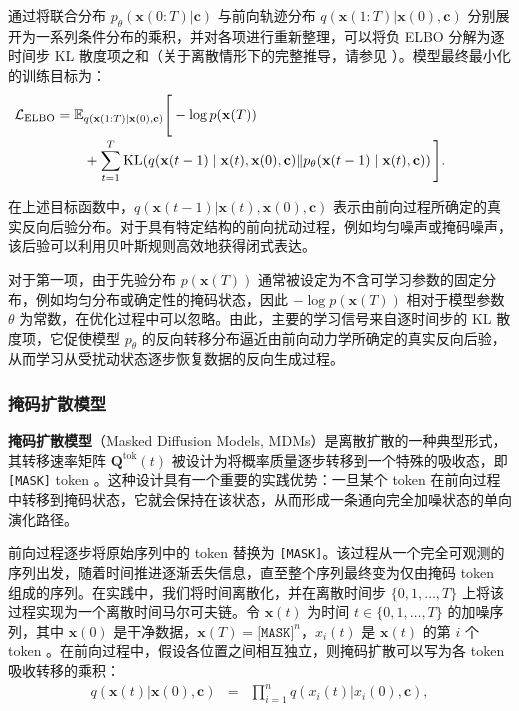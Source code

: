 通过将联合分布 $p_\theta(\mathbf{x}(0{:}T) | \mathbf{c})$ 与前向轨迹分布 $q(\mathbf{x}(1{:}T) | \mathbf{x}(0), \mathbf{c})$ 分别展开为一系列条件分布的乘积，并对各项进行重新整理，可以将负 ELBO 分解为逐时间步 KL 散度项之和（关于离散情形下的完整推导，请参见 \citep{austin-etal:2021structured}）。模型最终最小化的训练目标为：
\begin{equation}
\hspace*{-1.5cm}
\begin{aligned}
\mathcal{L}_{\mathrm{ELBO}}
&=
\mathbb{E}_{q(\mathbf{x}(1{:}T)\mid\mathbf{x}(0),\mathbf{c})}
\Bigg[
-\log p(\mathbf{x}(T))
\\[-2pt]
&\qquad+
\sum_{t=1}^{T}
\mathrm{KL}\!\left(
q(\mathbf{x}(t-1)\mid\mathbf{x}(t),\mathbf{x}(0),\mathbf{c})
\middle\Vert
p_{\theta}(\mathbf{x}(t-1)\mid\mathbf{x}(t),\mathbf{c})
\right)
\Bigg].
\end{aligned}
\label{eq:discrete-elbo}
\end{equation}

\noindent
在上述目标函数中，$q(\mathbf{x}(t-1)| \mathbf{x}(t),\mathbf{x}(0),\mathbf{c})$ 表示由前向过程所确定的真实反向后验分布。对于具有特定结构的前向扰动过程，例如均匀噪声或掩码噪声，该后验可以利用贝叶斯规则高效地获得闭式表达。

对于第一项，由于先验分布 $p(\mathbf{x}(T))$ 通常被设定为不含可学习参数的固定分布，例如均匀分布或确定性的掩码状态，因此 $-\log p(\mathbf{x}(T))$ 相对于模型参数 $\theta$ 为常数，在优化过程中可以忽略。由此，主要的学习信号来自逐时间步的 KL 散度项，它促使模型 $p_\theta$ 的反向转移分布逼近由前向动力学所确定的真实反向后验，从而学习从受扰动状态逐步恢复数据的反向生成过程。

\subsubsection{掩码扩散模型}

\textbf{掩码扩散模型}（Masked Diffusion Models, MDMs）是离散扩散的一种典型形式，其转移速率矩阵 $\mathbf{Q}^{\mathrm{tok}}(t)$ 被设计为将概率质量逐步转移到一个特殊的吸收态，即 \texttt{[MASK]}  token \citep{sahoo-etal:2024simple,nie-etal:2025large}。这种设计具有一个重要的实践优势：一旦某个 token 在前向过程中转移到掩码状态，它就会保持在该状态，从而形成一条通向完全加噪状态的单向演化路径。

前向过程逐步将原始序列中的 token 替换为 \texttt{[MASK]}。该过程从一个完全可观测的序列出发，随着时间推进逐渐丢失信息，直至整个序列最终变为仅由掩码 token 组成的序列。在实践中，我们将时间离散化，并在离散时间步 $\{0,1,\dots,T\}$ 上将该过程实现为一个离散时间马尔可夫链。令 $\mathbf{x}(t)$ 为时间 $t \in \{0,1,\dots,T\}$ 的加噪序列，其中 $\mathbf{x}(0)$ 是干净数据，$\mathbf{x}(T) = \texttt{[MASK]}^n$，$x_i(t)$ 是 $\mathbf{x}(t)$ 的第 $i$ 个 token 。在前向过程中，假设各位置之间相互独立，则掩码扩散可以写为各 token 吸收转移的乘积：
\begin{eqnarray}
q(\mathbf{x}(t) | \mathbf{x}(0), \mathbf{c}) & = & \prod_{i=1}^n q(x_i(t) | x_i(0), \mathbf{c}), \label{eq:mdm-forward-factorize}
\end{eqnarray}

